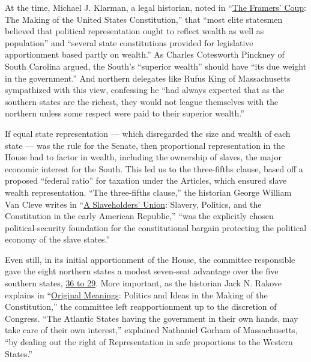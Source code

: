 At the time, Michael J. Klarman, a legal historian, noted in
``\href{https://global.oup.com/academic/product/the-framers-coup-9780199942039?facet_narrowbyreleaseDate_facet=Released\%20this\%20month\&facet_narrowbybinding_facet=Ebook\&facet_narrowbytype_facet=General\%20Interest\&lang=en\&cc=us}{The
Framers' Coup}: The Making of the United States Constitution,'' that
``most elite statesmen believed that political representation ought to
reflect wealth as well as population'' and ``several state constitutions
provided for legislative apportionment based partly on wealth.'' As
Charles Cotesworth Pinckney of South Carolina argued, the South's
``superior wealth'' should have ``its due weight in the government.''
And northern delegates like Rufus King of Massachusetts sympathized with
this view, confessing he ``had always expected that as the southern
states are the richest, they would not league themselves with the
northern unless some respect were paid to their superior wealth.''

If equal state representation --- which disregarded the size and wealth
of each state --- was the rule for the Senate, then proportional
representation in the House had to factor in wealth, including the
ownership of slaves, the major economic interest for the South. This led
us to the three-fifths clause, based off a proposed ``federal ratio''
for taxation under the Articles, which ensured slave wealth
representation. ``The three-fifths clause,'' the historian George
William Van Cleve writes in
``\href{https://press.uchicago.edu/ucp/books/book/chicago/S/bo9270100.html}{A
Slaveholders' Union}: Slavery, Politics, and the Constitution in the
early American Republic,'' ``was the explicitly chosen
political-security foundation for the constitutional bargain protecting
the political economy of the slave states.''

Even still, in its initial apportionment of the House, the committee
responsible gave the eight northern states a modest seven-seat advantage
over the five southern states, \href{https://d.pr/f/hDu7Kf}{36 to 29}.
More important, as the historian Jack N. Rakove explains in
``\href{https://www.penguinrandomhouse.com/books/137447/original-meanings-by-jack-n-rakove/}{Original
Meanings}: Politics and Ideas in the Making of the Constitution,'' the
committee left reapportionment up to the discretion of Congress. ``The
Atlantic States having the government in their own hands, may take care
of their own interest,'' explained Nathaniel Gorham of Massachusetts,
``by dealing out the right of Representation in safe proportions to the
Western States.''

